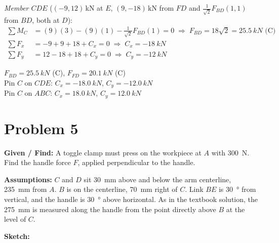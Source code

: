\documentclass[11pt]{article}
\newcommand{\problemhead}[2]{%
    \clearpage
    \section*{Problem #1}
    \textbf{Given / Find:} #2
}
\begin{document}
\textit{Member $CDE$} ($(-9, 12)$\,kN at $E$, $(9,-18)$\,kN from $FD$ and $\tfrac{1}{\sqrt2}F_{BD}(1,1)$ from $BD$, both at $D$):
\begin{align*}
\textstyle\sum M_C &= (9)(3) - (9)(1) - \tfrac{1}{\sqrt2}F_{BD}(1) = 0 \;\Rightarrow\; F_{BD} = 18\sqrt2 = \SI{25.5}{kN}\text{ (C)}\\
\textstyle\sum F_x &= -9 + 9 + 18 + C_x = 0 \;\Rightarrow\; C_x = \SI{-18}{kN}\\
\textstyle\sum F_y &= 12 - 18 + 18 + C_y = 0 \;\Rightarrow\; C_y = \SI{-12}{kN}
\end{align*}

\begin{finalanswer}
$F_{BD} = \SI{25.5}{kN}$ (C), \quad $F_{FD} = \SI{20.1}{kN}$ (C)\\[2pt]
Pin $C$ on $CDE$: $C_x = \SI{-18.0}{kN}$, $C_y = \SI{-12.0}{kN}$\\[2pt]
Pin $C$ on $ABC$: $C_x = \SI{18.0}{kN}$, $C_y = \SI{12.0}{kN}$
\end{finalanswer}

\problemhead{5}{A toggle clamp must press on the workpiece at $A$ with \SI{300}{N}. Find the handle force $F$, applied perpendicular to the handle.}

\textbf{Assumptions:} $C$ and $D$ sit \SI{30}{mm} above and below the arm centerline, \SI{235}{mm} from $A$. $B$ is on the centerline, \SI{70}{mm} right of $C$. Link $BE$ is \SI{30}{\degree} from vertical, and the handle is \SI{30}{\degree} above horizontal. As in the textbook solution, the \SI{275}{mm} is measured along the handle from the point directly above $B$ at the level of $C$.

\textbf{Sketch:}
\end{document}
